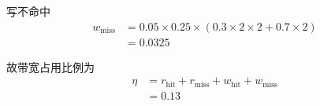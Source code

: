 \begin{solve}
\begin{enumerate}
    写不命中
    \begin{align*}
      w_{\mathrm{miss}} &= 0.05 \times 0.25 \times (0.3 \times 2
      \times 2 + 0.7 \times 2)\\
      &= 0.0325
    \end{align*}

    故带宽占用比例为
    \begin{align*}
      \eta &= r_{\mathrm{hit}} + r_{\mathrm{miss}} + w_{\mathrm{hit}}
      + w_{\mathrm{miss}}\\
      &= 0.13
    \end{align*}

  \end{enumerate}
\end{solve}



